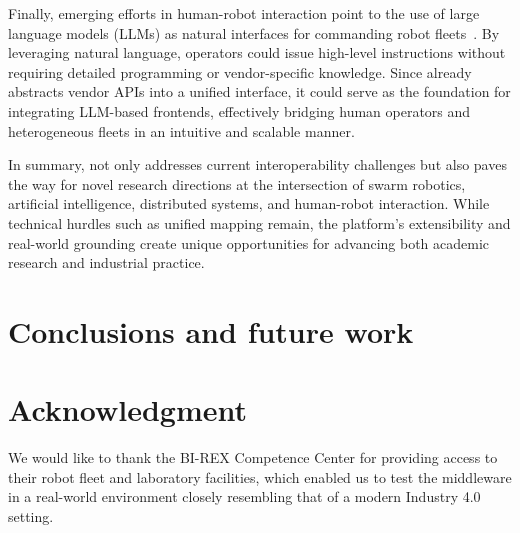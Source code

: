 \documentclass[conference]{IEEEtran}
\begin{document}
Finally, emerging efforts in human-robot interaction point to the use of large language models (LLMs) 
 as natural interfaces for commanding robot fleets~\cite{olaiya2025natural,aguzzi2025language}. 
% 
By leveraging natural language, operators could issue high-level instructions without requiring 
 detailed programming or vendor-specific knowledge. 
% 
Since \approach{} already abstracts vendor APIs into a unified interface, 
 it could serve as the foundation for integrating LLM-based frontends, 
 effectively bridging human operators and heterogeneous fleets in an intuitive and scalable manner.

In summary, \approach{} not only addresses current interoperability challenges 
 but also paves the way for novel research directions at the intersection of 
 swarm robotics, artificial intelligence, distributed systems, and human-robot interaction. 
% 
While technical hurdles such as unified mapping remain, 
 the platform's extensibility and real-world grounding create unique opportunities 
 for advancing both academic research and industrial practice.


\section{Conclusions and future work}\label{sec:future}

\section*{Acknowledgment}
We would like to thank the BI-REX Competence Center for providing access to their robot fleet and 
 laboratory facilities, which enabled us to test the middleware in a real-world environment closely 
  resembling that of a modern Industry 4.0 setting.




\end{document}
